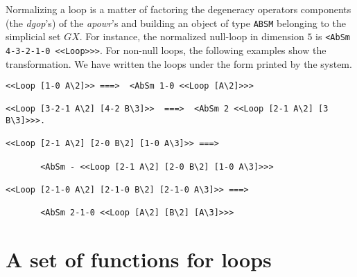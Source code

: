 Normalizing a loop is a matter of factoring the degeneracy operators  
components (the {\em dgop}'s) of the
{\em apowr}'s and building an  object of type {\tt ABSM}  belonging to the simplicial set $GX$.
For instance, the normalized null-loop in dimension $5$ is {\tt <AbSm 4-3-2-1-0 <<Loop>>>}. For non-null
loops, the following examples show the transformation. We have written the loops under the form printed by the
system.
{\footnotesize\begin{verbatim}
<<Loop [1-0 A\2]>> ===>  <AbSm 1-0 <<Loop [A\2]>>>

<<Loop [3-2-1 A\2] [4-2 B\3]>>  ===>  <AbSm 2 <<Loop [2-1 A\2] [3 B\3]>>>.

<<Loop [2-1 A\2] [2-0 B\2] [1-0 A\3]>> ===>  

       <AbSm - <<Loop [2-1 A\2] [2-0 B\2] [1-0 A\3]>>>

<<Loop [2-1-0 A\2] [2-1-0 B\2] [2-1-0 A\3]>> ===>  

       <AbSm 2-1-0 <<Loop [A\2] [B\2] [A\3]>>>
\end{verbatim}}

\section{A set of functions for loops}

